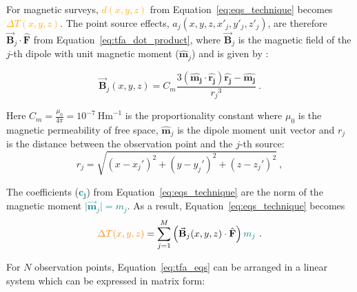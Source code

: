 For magnetic surveys, \textcolor{orange}{$d (x, y, z)$} from Equation~\ref{eq:eqs_technique} becomes \textcolor{orange}{$\Delta T(x, y, z)$}. The point source effects, $a_j(x, y, z, x'_j, y'_j , z'_j)$, are therefore $\vec{\mathbf{B}}_j \cdot \hat{\mathbf{F}}$ from Equation~\ref{eq:tfa_dot_product}, where $\vec{\mathbf{B}}_j$ is the magnetic field of the $j$-th dipole with unit magnetic moment ($\hat{\mathbf{m}}_j$) and is given by \citep{Blakley1995}:

\begin{equation}
    \vec{\mathbf{B}}_j (x, y, z) = C_m \dfrac{3 \left( \hat{\mathbf{m_j}} \cdot \hat{\mathbf{r_j}} \right) \hat{\mathbf{r_j}} - \hat{\mathbf{m_j}}}{{r_j}^3}
    \ .
    \label{eq:magnetic_field}
\end{equation}

\noindent
Here $C_m = \frac{\mu_0}{4 \pi} = 10^{-7} \ \text{Hm}^{-1}$ is the proportionality constant where $\mu_0$ is the magnetic permeability of free space, $\hat{\mathbf{m}}_j$ is the dipole moment unit vector and $r_j$ is the distance between the observation point and the $j$-th source:
\begin{equation}
    r_j = \sqrt{(x - x_j')^2 + (y - y_j')^2 + (z - z_j')^2}
    \ ,
\end{equation}
 

The coefficients (\textcolor{teal}{$\mathbf{c_j}$}) from Equation~\ref{eq:eqs_technique} are the norm of the magnetic moment \textcolor{teal}{$\vert \vec{\mathbf{m}}_j \vert = m_j$}. As a result, Equation~\ref{eq:eqs_technique} becomes
\begin{equation}
\label{eq:tfa_eqs}
\textcolor{orange}{\Delta T (x, y, z)} = \sum_{j=1}^{M} \left(\vec{\mathbf{B}}_j(x, y, z) \cdot \hat{\mathbf{F}}\right) \textcolor{teal}{m_j}
\ .
\end{equation}

For $N$ observation points, Equation~\ref{eq:tfa_eqs} can be arranged in a linear system which can be expressed in matrix form:


